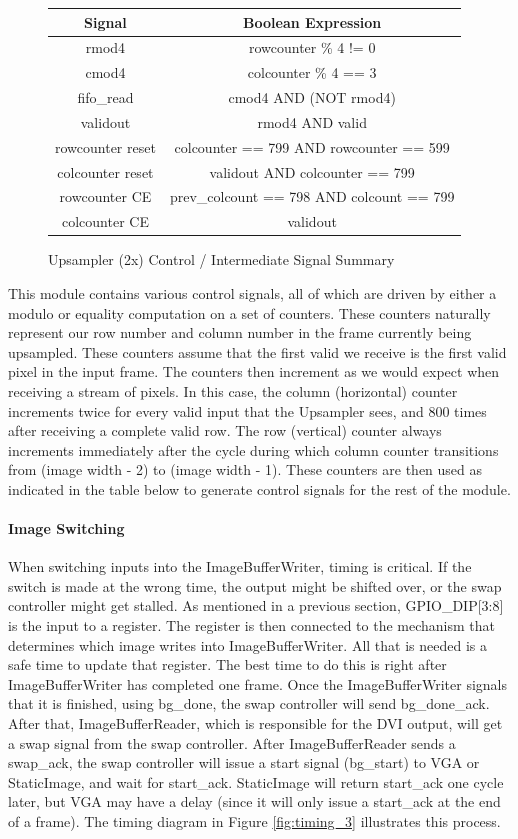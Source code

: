 \begin{figure}
    \centering
\tiny
\noindent \begin{tabular}{ c | c } \toprule
Signal & Boolean Expression \\\toprule
rmod4 & rowcounter \% 4 != 0 \\
cmod4 & colcounter \% 4 == 3 \\
fifo\_read & cmod4 AND (NOT rmod4) \\
validout & rmod4 AND valid \\
rowcounter reset & colcounter == 799 AND rowcounter == 599 \\
colcounter reset & validout AND colcounter == 799 \\
rowcounter CE & prev\_colcount == 798 AND colcount == 799 \\
colcounter CE & validout \\
\end{tabular}
\caption{ Upsampler (2x) Control / Intermediate Signal Summary } \label{fig:upsamplersignals}
\end{figure}

This module contains various control signals, all of which are driven by either
a modulo or equality computation on a set of counters. These counters naturally
represent our row number and column number in the frame currently being upsampled. 
These counters assume that the first valid we receive is the first valid pixel in the 
input frame. The counters then increment as we would expect when receiving a stream
of pixels. In this case, the column (horizontal) counter increments twice for
every valid input that the Upsampler sees, and 800 times after receiving a complete
valid row. The row (vertical) counter always increments immediately after the
cycle during which column counter transitions from (image width - 2) to (image width - 1).
These counters are then used as indicated in the table below to generate control
signals for the rest of the module.


\paragraph{Image Switching}
When switching inputs into the ImageBufferWriter, timing is critical. If the switch is made at the wrong time, the output might be shifted over, or the swap controller might get stalled. As mentioned in a previous section, GPIO\_DIP[3:8] is the input to a register. The register is then connected to the mechanism that determines which image writes into ImageBufferWriter. All that is needed is a safe time to update that register. The best time to do this is right after ImageBufferWriter has completed one frame. Once the ImageBufferWriter signals that it is finished, using bg\_done, the swap controller will send bg\_done\_ack. After that, ImageBufferReader, which is responsible for the DVI output, will get a swap signal from the swap controller. After ImageBufferReader sends a swap\_ack, the swap controller will issue a start signal (bg\_start) to VGA or StaticImage, and wait for start\_ack. StaticImage will return start\_ack one cycle later, but VGA may have a delay (since it will only issue a start\_ack at the end of a frame). The timing diagram in Figure \ref{fig:timing_3} illustrates this process.

